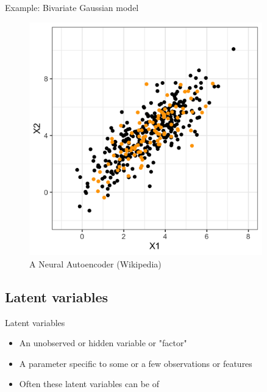 \documentclass[10pt]{beamer}
\begin{document}
\begin{frame}{Example: Bivariate Gaussian model}

\begin{figure}[h]
\centering
\includegraphics[width=0.9\textwidth]{fig/bi_model.png}
\caption{A Neural Autoencoder (Wikipedia)}
\end{figure}

\end{frame}




\subsection{Latent variables}

\begin{frame}{Latent variables}
\begin{itemize}
\item An {\color{uured} unobserved} or {\color{uured} hidden} variable or "factor"\pause
\item A parameter specific to some or a few observations or features\pause
\item Often these latent variables can be of 
\end{itemize}

\end{frame}
\end{document}
